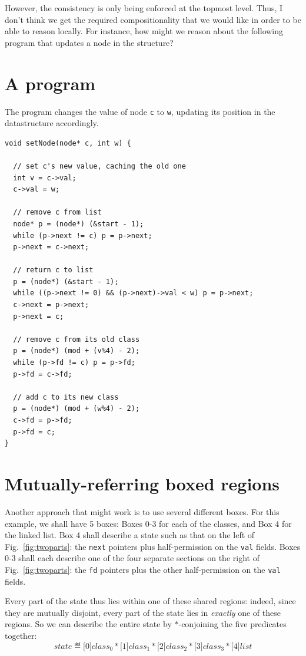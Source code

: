 \documentclass[12pt,a4paper]{article}
\begin{document}
However, the consistency is only being enforced at the topmost level. Thus, I don't think we get the required compositionality that we would like in order to be able to reason locally. For instance, how might we reason about the following program that updates a node in the structure?

\section{A program}

The program changes the value of node {\tt c} to {\tt w}, updating its position in the datastructure accordingly.
\begin{lstlisting}
void setNode(node* c, int w) {
  
  // set c's new value, caching the old one
  int v = c->val;
  c->val = w;
  
  // remove c from list 
  node* p = (node*) (&start - 1);
  while (p->next != c) p = p->next;
  p->next = c->next;
  
  // return c to list
  p = (node*) (&start - 1);
  while ((p->next != 0) && (p->next)->val < w) p = p->next;
  c->next = p->next;
  p->next = c;
  
  // remove c from its old class
  p = (node*) (mod + (v%4) - 2);
  while (p->fd != c) p = p->fd;
  p->fd = c->fd;
  
  // add c to its new class
  p = (node*) (mod + (w%4) - 2);
  c->fd = p->fd;
  p->fd = c;
}
\end{lstlisting}

\section{Mutually-referring boxed regions}

Another approach that might work is to use several different boxes. For this example, we shall have 5 boxes: Boxes 0-3 for each of the classes, and Box 4 for the linked list. Box 4 shall describe a state such as that on the left of Fig.~\ref{fig:twoparts}: the {\tt next} pointers plus half-permission on the {\tt val} fields. Boxes 0-3 shall each describe one of the four separate sections on the right of Fig.~\ref{fig:twoparts}: the {\tt fd} pointers plus the other half-permission on the {\tt val} fields.

Every part of the state thus lies within one of these shared regions: indeed, since they are mutually disjoint, every part of the state lies in \emph{exactly} one of these regions. So we can describe the entire state by $*$-conjoining the five predicates together:
\[
state ≝ \boxed[0]{class_0} * \boxed[1]{class_1} * \boxed[2]{class_2} * \boxed[3]{class_3} * \boxed[4]{list}
\]
\end{document}
